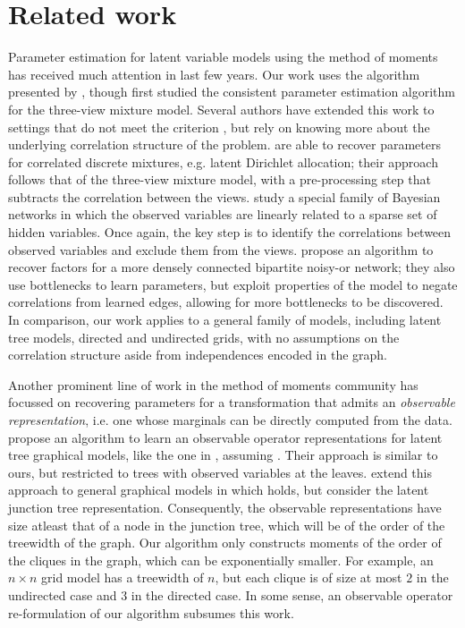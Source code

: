 \section{Related work}
\label{sec:related}

Parameter estimation for latent variable models using the method of
  moments has received much attention in last few years.
Our work uses the \TensorFactorize algorithm presented by
  \citet{anandkumar13tensor}, though \citet{anandkumar12moments} first
  studied the consistent parameter estimation algorithm for the
  three-view mixture model.
Several authors have extended this work to settings that do not meet the
  criterion , but rely on knowing more about
  the underlying correlation structure of the problem.
\citet{anandkumar12lda} are able to recover parameters for correlated
  discrete mixtures, e.g. latent Dirichlet allocation; their approach
  follows that of the three-view mixture model, with a pre-processing step
  that subtracts the correlation between the views.
\citet{anandkumar2013linear} study a special family of Bayesian networks
  in which the observed variables are linearly related to a sparse set of
  hidden variables. Once again, the key step is to identify the
  correlations between observed variables and exclude them from the views.
\citet{halpern13noisyor} propose an algorithm to recover factors for
  a more densely connected bipartite noisy-or network; they also use
  bottlenecks to learn parameters, but exploit properties of the model
  to negate correlations from learned edges, allowing for more
  bottlenecks to be discovered. 
In comparison, our work applies to a general family of models, including
  latent tree models, directed and undirected grids, with no assumptions
  on the correlation structure aside from independences encoded in the
  graph. 

Another prominent line of work in the method of moments community has
  focussed on recovering parameters for a transformation that admits an {\em observable
  representation}, i.e. one whose marginals can be directly computed from the data.
\citet{song2011spectral} propose an algorithm to learn an observable
  operator representations for latent tree graphical models, like the
  one in , assuming . 
Their approach is similar to ours, but restricted to trees with observed
  variables at the leaves.
\citet{parikh12spectral} extend this approach to general graphical
  models in which  holds, but consider the latent
  junction tree representation. 
Consequently, the observable representations have size atleast that of
  a node in the junction tree, which will be of the order of the treewidth
  of the graph. 
Our algorithm only constructs moments of the order of the cliques in the
  graph, which can be exponentially smaller. 
For example, an $n\times n$ grid model has a treewidth of $n$, but each
  clique is of size at most $2$ in the undirected case and $3$ in the
  directed case.
In some sense, an observable operator re-formulation of our algorithm
  subsumes this work.

